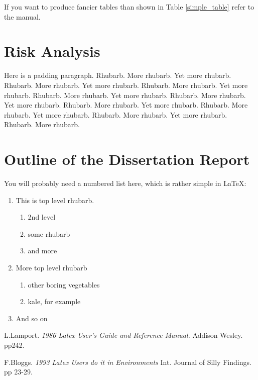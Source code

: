 \documentclass{article}
\begin{document}
If you want to produce fancier tables than shown in Table \ref{simple_table}
refer to the manual.



\section{Risk Analysis}

Here is a padding paragraph.  Rhubarb.  More rhubarb.  Yet more rhubarb. 
Rhubarb.  More rhubarb.  Yet more rhubarb.  Rhubarb.  More rhubarb.  Yet
more rhubarb.  Rhubarb.  More rhubarb.  Yet more rhubarb.  Rhubarb. 
More rhubarb.  Yet more rhubarb.  Rhubarb.  More rhubarb.  Yet more
rhubarb.  Rhubarb.  More rhubarb.  Yet more rhubarb.  Rhubarb.  More
rhubarb.  Yet more rhubarb.  Rhubarb.  More rhubarb.


\section{Outline of the Dissertation Report}

You will probably need a numbered list here, which is rather simple in \LaTeX:

\begin{enumerate}
	\item This is top level rhubarb.
	\begin{enumerate}
		\item 2nd level
		\item some rhubarb
		\item and more
	\end{enumerate}
	\item More top level rhubarb
	\begin{enumerate}
		\item other boring vegetables 
		\item kale, for example
	\end{enumerate}
	\item And so on
\end{enumerate}

\pagebreak
\begin{thebibliography}{100}

 L.Lamport. {\em 1986 Latex User's Guide
and Reference Manual.} Addison Wesley. pp242.

 F.Bloggs. {\em 1993 Latex Users do it
in Environments} Int. Journal of Silly Findings. pp 23-29.

\end{thebibliography}
\end{document}
